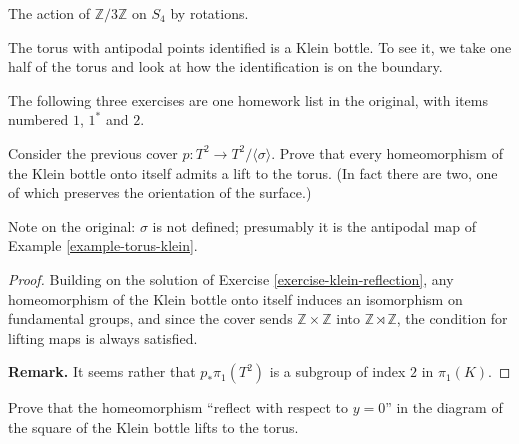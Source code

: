 \begin{example}
\label{example-rotations-genus-four}
The action of $\mathbb{Z}/3\mathbb{Z}$
on $S_4$ by rotations.
\end{example}

\begin{example}
\label{example-torus-klein}
The torus with antipodal points
identified is a Klein bottle. To see it,
we take one half of the torus and look
at how the identification is on the
boundary.
\end{example}

The following three exercises are one
homework list in the original, with
items numbered $1$, $1^*$ and $2$.

\begin{exercise}[Homework]
\label{exercise-klein-lifts}
Consider the previous cover
$p:T^2\to T^2/\langle\sigma\rangle$.
Prove that every homeomorphism of the
Klein bottle onto itself admits a lift
to the torus. (In fact there are two,
one of which preserves the orientation
of the surface.)
\end{exercise}

Note on the original: $\sigma$ is not
defined; presumably it is the antipodal
map of
Example \ref{example-torus-klein}.

\begin{proof}
Building on the solution of
Exercise \ref{exercise-klein-reflection},
any homeomorphism of the Klein bottle
onto itself induces an isomorphism on
fundamental groups, and since the cover
sends $\mathbb{Z}\times\mathbb{Z}$ into
$\mathbb{Z}\rtimes\mathbb{Z}$, the
condition for lifting maps is always
satisfied.

{\bf Remark.} It seems rather that
$p_*\pi_1(T^2)$ is a subgroup of index
$2$ in $\pi_1(K)$.
\end{proof}

\begin{exercise}
\label{exercise-klein-reflection}
Prove that the homeomorphism ``reflect
with respect to $y=0$'' in the diagram
of the square of the Klein bottle lifts
to the torus.
\end{exercise}

